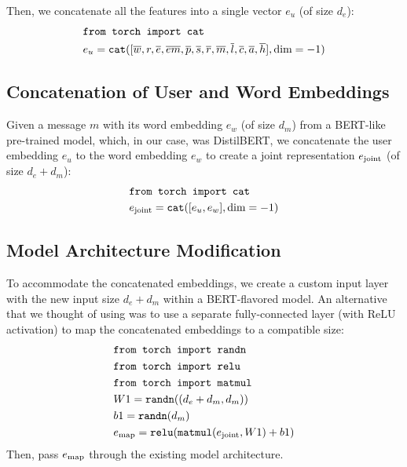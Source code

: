 \documentclass{article}
\begin{document}
Then, we concatenate all the features into a single vector $e_u$ (of size $d_e$):
\begin{equation}
\begin{aligned}
&\text{\texttt{from torch import cat}} \\
&e_u = \textnormal{\texttt{cat}}([\overline{w}, r, \overline{e}, \overline{em}, \overline{p}, \overline{s}, \overline{r}, \overline{m}, \overline{l}, \overline{c}, \overline{a}, \overline{h}], \textnormal{dim}=-1)
\end{aligned}
\end{equation}
\subsection{Concatenation of User and Word Embeddings}
Given a message $m$ with its word embedding $e_w$ (of size $d_m$) from a BERT-like pre-trained model, which, in our case, was DistilBERT\cite{sanh2020distilbert}, we concatenate the user embedding $e_u$ to the word embedding $e_w$ to create a joint representation $e_\textnormal{joint}$ (of size $d_e + d_m$):
\begin{equation}
\begin{aligned}
&\text{\texttt{from torch import cat}} \\
&e_\textnormal{joint} = \textnormal{\texttt{cat}}([e_u, e_w], \textnormal{dim}=-1)
\end{aligned}
\end{equation}

\subsection{Model Architecture Modification}
To accommodate the concatenated embeddings, we create a custom input layer with the new input size $d_e + d_m$ within a BERT-flavored model. An alternative that we thought of using was to use a separate fully-connected layer (with ReLU activation) to map the concatenated embeddings to a compatible size:
\begin{equation}
\begin{aligned}
&\text{\texttt{from torch import randn}} \\
&\text{\texttt{from torch import relu}} \\
&\text{\texttt{from torch import matmul}} \\
&W1 = \text{\texttt{randn}}((d_e + d_m, d_m)) \\
&b1 = \text{\texttt{randn}}(d_m) \\
&e_\textnormal{map} = \text{\texttt{relu}}(\text{\texttt{matmul}}(e_\textnormal{joint}, W1) + b1)
\end{aligned}
\end{equation}
Then, pass $e_\textnormal{map}$ through the existing model architecture.
\end{document}
